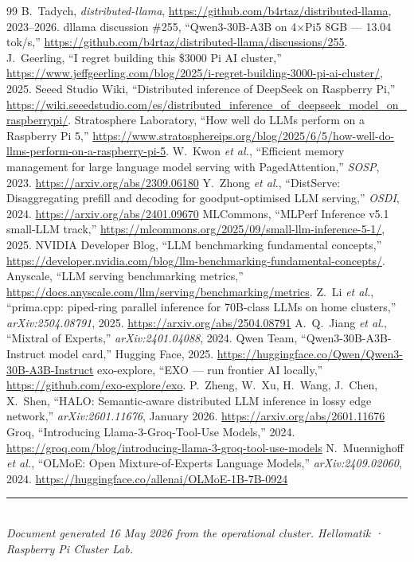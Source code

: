 \documentclass[11pt,a4paper]{article}
\begin{document}
\begin{thebibliography}{99}
\small
{} B.\ Tadych, \emph{distributed-llama}, \url{https://github.com/b4rtaz/distributed-llama}, 2023--2026.
 dllama discussion \#255, ``Qwen3-30B-A3B on 4×Pi5 8GB --- 13.04 tok/s,'' \url{https://github.com/b4rtaz/distributed-llama/discussions/255}.
 J.\ Geerling, ``I regret building this \$3000 Pi AI cluster,'' \url{https://www.jeffgeerling.com/blog/2025/i-regret-building-3000-pi-ai-cluster/}, 2025.
 Seeed Studio Wiki, ``Distributed inference of DeepSeek on Raspberry Pi,'' \url{https://wiki.seeedstudio.com/es/distributed_inference_of_deepseek_model_on_raspberrypi/}.
 Stratosphere Laboratory, ``How well do LLMs perform on a Raspberry Pi 5,'' \url{https://www.stratosphereips.org/blog/2025/6/5/how-well-do-llms-perform-on-a-raspberry-pi-5}.
 W.\ Kwon \emph{et al.}, ``Efficient memory management for large language model serving with PagedAttention,'' \emph{SOSP}, 2023. \url{https://arxiv.org/abs/2309.06180}
 Y.\ Zhong \emph{et al.}, ``DistServe: Disaggregating prefill and decoding for goodput-optimised LLM serving,'' \emph{OSDI}, 2024. \url{https://arxiv.org/abs/2401.09670}
 MLCommons, ``MLPerf Inference v5.1 small-LLM track,'' \url{https://mlcommons.org/2025/09/small-llm-inference-5-1/}, 2025.
 NVIDIA Developer Blog, ``LLM benchmarking fundamental concepts,'' \url{https://developer.nvidia.com/blog/llm-benchmarking-fundamental-concepts/}.
 Anyscale, ``LLM serving benchmarking metrics,'' \url{https://docs.anyscale.com/llm/serving/benchmarking/metrics}.
 Z.\ Li \emph{et al.}, ``prima.cpp: piped-ring parallel inference for 70B-class LLMs on home clusters,'' \emph{arXiv:2504.08791}, 2025. \url{https://arxiv.org/abs/2504.08791}
 A.\ Q.\ Jiang \emph{et al.}, ``Mixtral of Experts,'' \emph{arXiv:2401.04088}, 2024.
 Qwen Team, ``Qwen3-30B-A3B-Instruct model card,'' Hugging Face, 2025. \url{https://huggingface.co/Qwen/Qwen3-30B-A3B-Instruct}
 exo-explore, ``EXO --- run frontier AI locally,'' \url{https://github.com/exo-explore/exo}.
 P.\ Zheng, W.\ Xu, H.\ Wang, J.\ Chen, X.\ Shen, ``HALO: Semantic-aware distributed LLM inference in lossy edge network,'' \emph{arXiv:2601.11676}, January 2026. \url{https://arxiv.org/abs/2601.11676}
 Groq, ``Introducing Llama-3-Groq-Tool-Use Models,'' 2024. \url{https://groq.com/blog/introducing-llama-3-groq-tool-use-models}
 N.\ Muennighoff \emph{et al.}, ``OLMoE: Open Mixture-of-Experts Language Models,'' \emph{arXiv:2409.02060}, 2024. \url{https://huggingface.co/allenai/OLMoE-1B-7B-0924}
\end{thebibliography}

\vfill
\begin{center}
\rule{0.6\textwidth}{0.4pt}\\[0.3cm]
\small\itshape Document generated 16 May 2026 from the operational cluster. Hellomatik · Raspberry Pi Cluster Lab.
\end{center}
\end{document}

